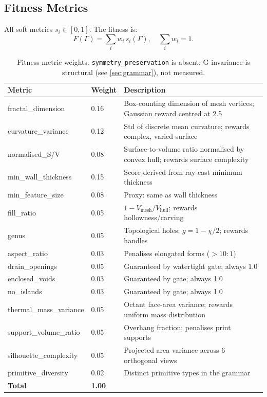 \documentclass[11pt, a4paper]{article}
\begin{document}
\subsection{Fitness Metrics}

All soft metrics $s_i \in [0,1]$. The fitness is:
\begin{equation}
  F(\Gamma) = \sum_{i} w_i \, s_i(\Gamma), \quad \sum_i w_i = 1.
  \label{eq:fitness}
\end{equation}

\begin{table}[h]
\centering
\begin{tabular}{llp{7cm}}
\toprule
Metric & Weight & Description \\
\midrule
fractal\_dimension     & 0.16 & Box-counting dimension of mesh vertices; Gaussian reward centred at 2.5 \\
curvature\_variance    & 0.12 & Std of discrete mean curvature; rewards complex, varied surface \\
normalised\_S/V        & 0.08 & Surface-to-volume ratio normalised by convex hull; rewards surface complexity \\
min\_wall\_thickness   & 0.15 & Score derived from ray-cast minimum thickness \\
min\_feature\_size     & 0.08 & Proxy: same as wall thickness \\
fill\_ratio            & 0.05 & $1 - V_{\mathrm{mesh}}/V_{\mathrm{hull}}$; rewards hollowness/carving \\
genus                  & 0.05 & Topological holes; $g = 1 - \chi/2$; rewards handles \\
aspect\_ratio          & 0.03 & Penalises elongated forms ($> 10:1$) \\
drain\_openings        & 0.05 & Guaranteed by watertight gate; always 1.0 \\
enclosed\_voids        & 0.03 & Guaranteed by gate; always 1.0 \\
no\_islands            & 0.03 & Guaranteed by gate; always 1.0 \\
thermal\_mass\_variance& 0.05 & Octant face-area variance; rewards uniform mass distribution \\
support\_volume\_ratio & 0.05 & Overhang fraction; penalises print supports \\
silhouette\_complexity & 0.05 & Projected area variance across 6 orthogonal views \\
primitive\_diversity   & 0.02 & Distinct primitive types in the grammar \\
\midrule
\textbf{Total}         & \textbf{1.00} & \\
\bottomrule
\end{tabular}
\caption{Fitness metric weights. \texttt{symmetry\_preservation} is absent:
G-invariance is structural (see \cref{sec:grammar}), not measured.}
\label{tab:weights}
\end{table}
\end{document}
